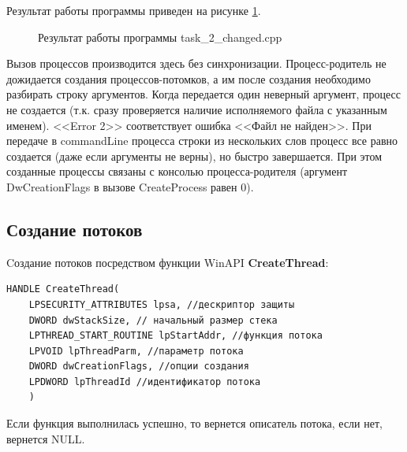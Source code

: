 \documentclass[a4paper]{article}
\begin{document}
	Результат работы программы приведен на рисунке \ref{img:task2changed}.
	\begin{figure}[h!]
		\caption{Результат работы программы task\_2\_changed.cpp}
		\label{img:task2changed}
	\end{figure}
	
	Вызов процессов производится здесь без синхронизации. Процесс-родитель не дожидается создания процессов-потомков, а им после создания необходимо разбирать строку аргументов. Когда передается один неверный аргумент, процесс не создается (т.к. сразу проверяется наличие исполняемого файла с указанным именем). <<Error 2>> соответствует ошибка <<Файл не найден>>. При передаче в commandLine процесса строки из нескольких слов процесс все равно создается (даже если аргументы не верны), но быстро завершается. При этом созданные процессы связаны с консолью процесса-родителя (аргумент DwCreationFlags в вызове CreateProcess равен 0).
	
	\subsection{Создание потоков}	
	Cоздание потоков посредством функции WinAPI \textbf{CreateThread}:
	\begin{lstlisting}[style=crs_cpp]
HANDLE CreateThread( 
	LPSECURITY_ATTRIBUTES lpsa, //дескриптор защиты 
	DWORD dwStackSize, // начальный размер стека 
	LPTHREAD_START_ROUTINE lpStartAddr, //функция потока 
	LPVOID lpThreadParm, //параметр потока 
	DWORD dwCreationFlags, //опции создания 
	LPDWORD lpThreadId //идентификатор потока 
	)	
	\end{lstlisting}
	
	Если функция выполнилась успешно, то вернется описатель потока, если нет, вернется NULL.
	
\end{document}
